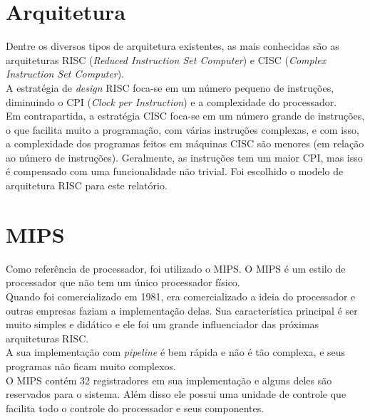 \documentclass[
	12pt,
	openright,
	a4paper,
	english,			
	french,				
	spanish,			
	brazil,				
	]{abntex2}
\begin{document}
\section{Arquitetura}
Dentre os diversos tipos de arquitetura existentes, as mais conhecidas são as arquiteturas RISC (\textit{Reduced Instruction Set Computer}) e CISC (\textit{Complex Instruction Set Computer}).\\
A estratégia de \textit{design} RISC foca-se em um número pequeno de instruções, diminuindo o CPI (\textit{Clock per Instruction}) e a complexidade do processador.\\
Em contrapartida, a estratégia CISC foca-se em um número grande de instruções, o que facilita muito a programação, com várias instruções complexas, e com isso, a complexidade dos programas feitos em máquinas CISC são menores (em relação ao número de instruções).
Geralmente, as instruções tem um maior CPI, mas isso é compensado com uma funcionalidade não trivial.
Foi escolhido o modelo de arquitetura RISC para este relatório.\\

\section{MIPS}
Como referência de processador, foi utilizado o MIPS. O MIPS é um estilo de processador que não tem um único processador físico. 
\\
Quando foi comercializado em 1981, era comercializado a ideia do processador e outras empresas faziam a implementação delas. Sua característica principal é ser muito simples e didático e ele foi um grande influenciador das próximas arquiteturas RISC.\\
A sua implementação com \textit{pipeline} é bem rápida e não é tão complexa, e seus programas não ficam muito complexos.\\
O MIPS contém 32 registradores em sua implementação e alguns deles são reservados para o sistema. Além disso ele possui uma unidade de controle que facilita todo o controle do processador e seus componentes.\\
\end{document}
